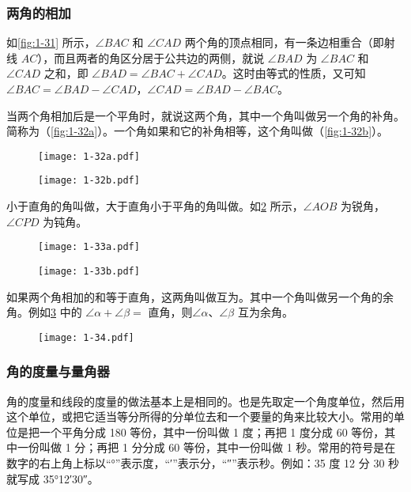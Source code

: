 \subsubsection{两角的相加}
如\cref{fig:1-31} 所示，$\angle BAC$ 和 $\angle CAD$ 两个角的顶点相同，有一条边相重合（即射线 $AC$），而且两者的角区分居于公共边的两侧，就说 $\angle BAD$ 为 $\angle BAC$ 和 $\angle CAD$ 之和，即 $\angle BAD=\angle BAC+\angle CAD$。这时由等式的性质，又可知 $\angle BAC=\angle BAD-\angle CAD$，$\angle CAD=\angle BAD-\angle BAC$。

当两个角相加后是一个平角时，就说这两个角，其中一个角叫做另一个角的补角。简称为（\cref{fig:1-32a}）。一个角如果和它的补角相等，这个角叫做（\cref{fig:1-32b}）。

\begin{figure}
	\begin{minipage}[b]{0.45\linewidth}\centering
	  \texttt{[image: 1-32a.pdf]}
		\subcaption{}\label{fig:1-32a}
	\end{minipage}
	\begin{minipage}[b]{0.45\linewidth}\centering
	  \texttt{[image: 1-32b.pdf]}
		\subcaption{}\label{fig:1-32b}
	\end{minipage}
	\caption{}\label{fig:1-32}
\end{figure}

小于直角的角叫做，大于直角小于平角的角叫做。如\cref{fig:1-33} 所示，$\angle AOB$ 为锐角，$\angle CPD$ 为钝角。
\begin{figure}
	\begin{minipage}[b]{0.45\linewidth}\centering
		\texttt{[image: 1-33a.pdf]}
		\subcaption{}\label{fig:1-33a}
	\end{minipage}
	\begin{minipage}[b]{0.45\linewidth}\centering
		\texttt{[image: 1-33b.pdf]}
		\subcaption{}\label{fig:1-33b}
	\end{minipage}
	\caption{}\label{fig:1-33}
\end{figure}

如果两个角相加的和等于直角，这两角叫做互为。其中一个角叫做另一个角的余角。例如\cref{fig:1-34} 中的 $\angle\alpha+\angle\beta=$ 直角，则$\angle\alpha$、$\angle\beta$ 互为余角。

\begin{figure}
	\texttt{[image: 1-34.pdf]}
	\caption{}\label{fig:1-34}
\end{figure}

\subsubsection{角的度量与量角器}
角的度量和线段的度量的做法基本上是相同的。也是先取定一个角度单位，然后用这个单位，或把它适当等分所得的分单位去和一个要量的角来比较大小。常用的单位是把一个平角分成 180 等份，其中一份叫做 1 度；再把 1 度分成 60 等份，其中一份叫做 1 分；再把 1 分分成 60 等份，其中一份叫做 1 秒。常用的符号是在数字的右上角上标以“\unit{\degree}”表示度，“\unit{\arcminute}”表示分，“\unit{\arcsecond}”表示秒。例如：35 度 12 分 30 秒就写成 \ang{35;12;30}。

